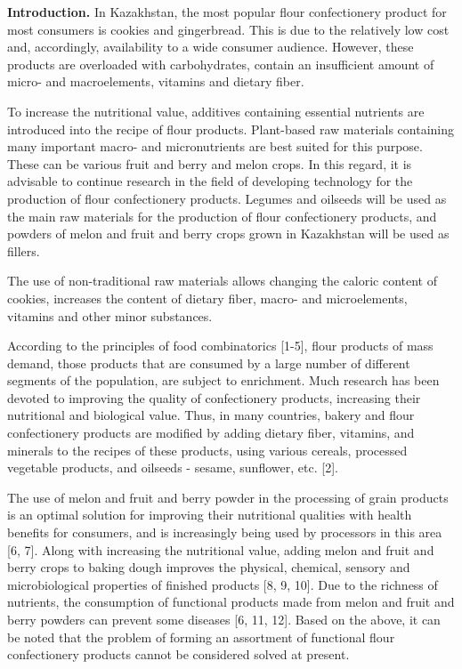 \begin{multicols}{2}
{\bfseries Introduction.} In Kazakhstan, the most popular flour
confectionery product for most consumers is cookies and gingerbread.
This is due to the relatively low cost and, accordingly, availability to
a wide consumer audience. However, these products are overloaded with
carbohydrates, contain an insufficient amount of micro- and
macroelements, vitamins and dietary fiber.

To increase the nutritional value, additives containing essential
nutrients are introduced into the recipe of flour products. Plant-based
raw materials containing many important macro- and micronutrients are
best suited for this purpose. These can be various fruit and berry and
melon crops. In this regard, it is advisable to continue research in the
field of developing technology for the production of flour confectionery
products. Legumes and oilseeds will be used as the main raw materials
for the production of flour confectionery products, and powders of melon
and fruit and berry crops grown in Kazakhstan will be used as fillers.

The use of non-traditional raw materials allows changing the caloric
content of cookies, increases the content of dietary fiber, macro- and
microelements, vitamins and other minor substances.

According to the principles of food combinatorics {[}1-5{]}, flour
products of mass demand, those products that are consumed by a large
number of different segments of the population, are subject to
enrichment. Much research has been devoted to improving the quality of
confectionery products, increasing their nutritional and biological
value. Thus, in many countries, bakery and flour confectionery products
are modified by adding dietary fiber, vitamins, and minerals to the
recipes of these products, using various cereals, processed vegetable
products, and oilseeds - sesame, sunflower, etc. {[}2{]}.

The use of melon and fruit and berry powder in the processing of grain
products is an optimal solution for improving their nutritional
qualities with health benefits for consumers, and is increasingly being
used by processors in this area {[}6, 7{]}. Along with increasing the
nutritional value, adding melon and fruit and berry crops to baking
dough improves the physical, chemical, sensory and microbiological
properties of finished products {[}8, 9, 10{]}. Due to the richness of
nutrients, the consumption of functional products made from melon and
fruit and berry powders can prevent some diseases {[}6, 11, 12{]}. Based
on the above, it can be noted that the problem of forming an assortment
of functional flour confectionery products cannot be considered solved
at present.


\end{multicols}
